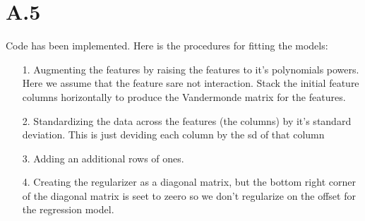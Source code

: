 \documentclass[]{article}
\begin{document}
    \section*{A.5}
        Code has been implemented. Here is the procedures for fitting the models: 
        \begin{enumerate}
        \item[1.] Augmenting the features by raising the features to it's polynomials powers. Here we assume that the feature sare not interaction. Stack the initial feature columns horizontally to produce the Vandermonde matrix for the features. 
        \item[2.] Standardizing the data across the features (the columns) by it's standard deviation. This is just deviding each column by the sd of that column  
        \item[3.] Adding an additional rows of ones. 
        \item[4.] Creating the regularizer as a diagonal matrix, but the bottom right corner of the diagonal matrix is seet to zeero so we don't regularize on the offset for the regression model.  
        \end{enumerate}
        \label{lst:A.5.1}
\end{document}
